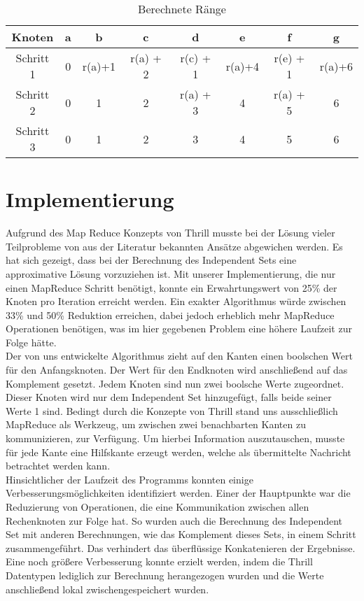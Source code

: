 \documentclass[a0,portrait]{a0poster}
\begin{document}
\begin{multicols}{2}
\begin{table}[H]          %
\centering
\begin{tabular*}{\linewidth}{@{\extracolsep{\fill}}cccccccc}
\hline
\hline
\rule[-7pt]{0pt}{23pt}  Knoten & a & b & c & d &e & f & g\\
\hline
\rule[-6pt]{0pt}{21pt}   Schritt 1 & 0 & r(a)+1 & r(a) + 2 & r(c) + 1  & r(a)+4  & r(e) + 1 & r(a)+6\\
\hline
\rule[-6pt]{0pt}{21pt}   Schritt 2 & 0 & 1 & 2 & r(a) + 3  & 4  & r(a) + 5 & 6\\
\hline
\rule[-6pt]{0pt}{21pt}   Schritt 3 & 0 & 1 & 2 & 3  & 4  & 5 & 6\\
\hline
\hline
\end{tabular*}  
\caption[]{Berechnete Ränge} 
\label{Raumtemperatur}                             %
\end{table}

\section*{Implementierung}
Aufgrund des Map Reduce Konzepts von Thrill musste bei der Lösung vieler Teilprobleme von aus der Literatur bekannten Ansätze abgewichen werden. 
Es hat sich gezeigt, dass bei der Berechnung des Independent Sets eine approximative Lösung vorzuziehen ist. 
Mit unserer Implementierung, die nur einen MapReduce Schritt benötigt, konnte ein Erwahrtungswert von 25\% der Knoten pro Iteration erreicht werden. 
Ein exakter Algorithmus würde zwischen 33\% und 50\% Reduktion erreichen, dabei jedoch erheblich mehr MapReduce Operationen benötigen, was im hier gegebenen 
Problem eine höhere Laufzeit zur Folge hätte.\\
Der von uns entwickelte Algorithmus zieht auf den Kanten einen boolschen Wert für den Anfangsknoten. Der Wert für den Endknoten wird anschließend auf 
das Komplement gesetzt. Jedem Knoten sind nun zwei boolsche Werte zugeordnet. Dieser Knoten wird nur dem Independent Set hinzugefügt, falls beide seiner Werte 1 sind. 
Bedingt durch die Konzepte von Thrill stand uns ausschließlich MapReduce als Werkzeug, um zwischen zwei benachbarten Kanten zu kommunizieren, zur Verfügung. 
Um hierbei Information auszutauschen, musste für jede Kante eine Hilfskante erzeugt werden, welche als übermittelte Nachricht betrachtet werden kann. \\ 
Hinsichtlicher der Laufzeit des Programms konnten einige Verbesserungsmöglichkeiten identifiziert werden. Einer der Hauptpunkte war die Reduzierung von Operationen, die 
eine Kommunikation zwischen allen Rechenknoten zur Folge hat. So wurden auch die Berechnung des Independent Set mit anderen Berechnungen, wie das Komplement dieses Sets, 
in einem Schritt zusammengeführt. Das verhindert das überflüssige Konkatenieren der Ergebnisse.\\
Eine noch größere Verbesserung konnte erzielt werden, indem die Thrill Datentypen lediglich zur Berechnung herangezogen wurden und die Werte anschließend lokal 
zwischengespeichert wurden.


\end{multicols}
\end{document}
